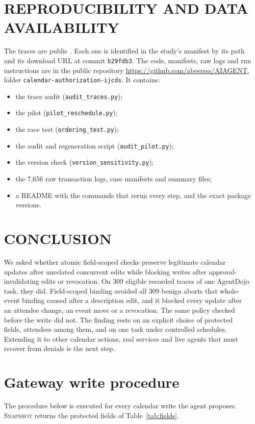 \section{REPRODUCIBILITY AND DATA AVAILABILITY}
\label{sec:repro}
The traces are public \cite{agentdojorepo}. Each one is identified in the study's manifest by its path and its download URL at commit \texttt{b29fdb3}. The code, manifests, raw logs and run instructions are in the public repository \url{https://github.com/abeersss/AIAGENT}, folder \texttt{calendar-authorization-ijcds}. It contains:
\begin{itemize}
\item the trace audit (\texttt{audit\_traces.py});
\item the pilot (\texttt{pilot\_reschedule.py});
\item the race test (\texttt{ordering\_test.py});
\item the audit and regeneration script (\texttt{audit\_pilot.py});
\item the version check (\texttt{version\_sensitivity.py});
\item the 7,656 raw transaction logs, case manifests and summary files;
\item a README with the commands that rerun every step, and the exact package versions.
\end{itemize}

\section{CONCLUSION}
\label{sec:conclusion}
We asked whether atomic field-scoped checks preserve legitimate calendar updates after unrelated concurrent edits while blocking writes after approval-invalidating edits or revocation. On 309 eligible recorded traces of one AgentDojo task, they did. Field-scoped binding avoided all 309 benign aborts that whole-event binding caused after a description edit, and it blocked every update after an attendee change, an event move or a revocation. The same policy checked before the write did not. The finding rests on an explicit choice of protected fields, attendees among them, and on one task under controlled schedules. Extending it to other calendar actions, real services and live agents that must recover from denials is the next step.

\appendices

\section{Gateway write procedure}
\label{app:procedure}
The procedure below is executed for every calendar write the agent proposes. \textsc{Snapshot} returns the protected fields of Table~\ref{tab:fields}.

